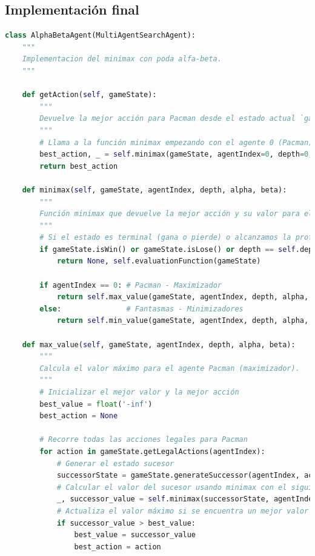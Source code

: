 \documentclass{report}
\begin{document}
        \subsection*{Implementación final}
            \begin{lstlisting}[language=Python, caption=Implementación final del agente Alpha-Beta]
class AlphaBetaAgent(MultiAgentSearchAgent):
    """
    Implementacion del minimax con poda alfa-beta.
    """

    def getAction(self, gameState):
        """
        Devuelve la mejor acción para Pacman desde el estado actual `gameState` usando Minimax.
        """
        # Llama a la función minimax empezando con el agente 0 (Pacman) y profundidad 0
        best_action, _ = self.minimax(gameState, agentIndex=0, depth=0, alpha=float('-inf'), beta=float('inf'))
        return best_action

    def minimax(self, gameState, agentIndex, depth, alpha, beta):
        """
        Función minimax que devuelve la mejor acción y su valor para el agente actual.
        """
        # Si el estado es terminal (gana o pierde) o alcanzamos la profundidad máxima, evaluamos el estado
        if gameState.isWin() or gameState.isLose() or depth == self.depth:
            return None, self.evaluationFunction(gameState)

        if agentIndex == 0: # Pacman - Maximizador
            return self.max_value(gameState, agentIndex, depth, alpha, beta)
        else:               # Fantasmas - Minimizadores
            return self.min_value(gameState, agentIndex, depth, alpha, beta)

    def max_value(self, gameState, agentIndex, depth, alpha, beta):
        """
        Calcula el valor máximo para el agente Pacman (maximizador).
        """
        # Inicializar el mejor valor y la mejor acción
        best_value = float('-inf')
        best_action = None

        # Recorre todas las acciones legales para Pacman
        for action in gameState.getLegalActions(agentIndex):
            # Generar el estado sucesor
            successorState = gameState.generateSuccessor(agentIndex, action)
            # Calcular el valor del sucesor usando minimax con el siguiente agente
            _, successor_value = self.minimax(successorState, agentIndex + 1, depth, alpha, beta)
            # Actualiza el valor máximo si se encuentra un mejor valor
            if successor_value > best_value:
                best_value = successor_value
                best_action = action
                

\end{lstlisting}
\end{document}
